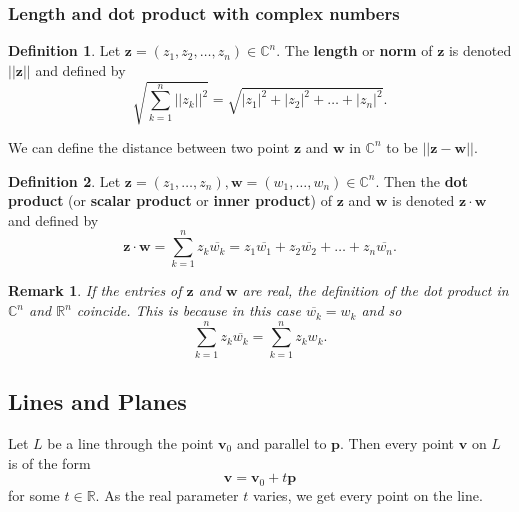 \documentclass[12pt, a4paper]{article}
\newtheorem*{remark}{Remark}
\theoremstyle{definition}
\newtheorem{definition}{Definition}[section]
\theoremstyle{plain}
\newcommand{\bb}[1]{\mathbb{#1}}
\newcommand{\conj}[1]{\overline{#1}}
\newcommand{\vect}[1]{\mathbf{#1}}
\begin{document}
\subsubsection{Length and dot product with complex numbers}

\begin{definition} Let $\vect{z}=(z_1,z_2,\ldots,z_n) \in \bb{C}^n.$ The \textbf{length} or \textbf{norm} of $\vect{z}$ is denoted $||\vect{z}||$ and defined by $$\sqrt{\sum_{k=1}^{n} ||z_k||^2} = \sqrt{|z_1|^2+|z_2|^2+\ldots+|z_n|^2}.$$ \end{definition}

We can define the distance between two point $\vect{z}$ and $\vect{w}$ in $\bb{C}^n$ to be $||\vect{z-w}||.$

\begin{definition} Let $\vect{z}=(z_1,\ldots,z_n), \vect{w}=(w_1,\ldots,w_n) \in \bb{C}^n.$ Then the \textbf{dot product} (or \textbf{scalar product} or \textbf{inner product}) of $\vect{z}$ and $\vect{w}$ is denoted $\vect{z}\cdot \vect{w}$ and defined by $$\vect{z}\cdot\vect{w} = \sum_{k=1}^{n}z_k\conj{w_k} =z_1\conj{w_1}+z_2\conj{w_2}+\ldots+z_n\conj{w_n}.$$ \end{definition}

\begin{remark}
If the entries of $\vect{z}$ and $\vect{w}$ are real, the definition of the dot product in $\bb{C}^n$ and $\bb{R}^n$ coincide. This is because in this case $\conj{w_k}=w_k$ and so $$\sum_{k=1}^{n} z_k\conj{w_k} = \sum_{k=1}^{n}z_k w_k.$$
\end{remark}
 
\subsection{Lines and Planes}

Let $L$ be a line through the point $\vect{v}_0$ and parallel to $\vect{p}.$ Then every point $\vect{v}$ on $L$ is of the form $$\vect{v}=\vect{v}_0+t\vect{p}$$ for some $t \in \bb{R}.$ As the real parameter $t$ varies, we get every point on the line. 

\begin{center}
\end{center}
\end{document}
